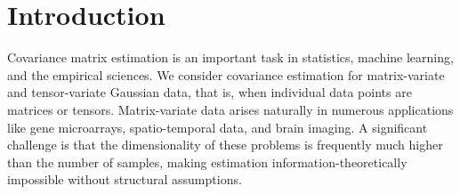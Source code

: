 \documentclass[aos]{imsart}
\theoremstyle{definition}
\numberwithin{equation}{section}
\begin{document}
\begin{frontmatter}
\begin{abstract}


\end{abstract}
\begin{keyword}[class=MSC2020]
\end{keyword}

\begin{keyword}
\end{keyword}
\end{frontmatter}
\tableofcontents

\section{Introduction}
Covariance matrix estimation is an important task in statistics, machine learning, and the empirical sciences.
We consider covariance estimation for matrix-variate and tensor-variate Gaussian data, that is, when individual data points are matrices or tensors. Matrix-variate data arises naturally in numerous applications like gene microarrays, spatio-temporal data, and brain imaging.
A significant challenge is that the dimensionality of these problems is frequently much higher than the number of samples, making estimation information-theoretically impossible without structural assumptions.
\end{document}
